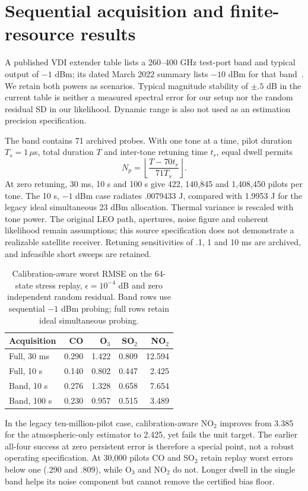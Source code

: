\section{Sequential acquisition and finite-resource results}
A published VDI extender table lists a 260--400 GHz test-port band and typical output of $-1$ dBm; its dated March 2022 summary lists $-10$ dBm for that band~\cite{vdiCurrent,vdi2022}. We retain both powers as scenarios. Typical magnitude stability of $\pm.5$ dB in the current table is neither a measured spectral error for our setup nor the random residual SD in our likelihood. Dynamic range is also not used as an estimation precision specification.

The band contains 71 archived probes. With one tone at a time, pilot duration $T_s=1\,\mu$s, total duration $T$ and inter-tone retuning time $t_r$, equal dwell permits
\[
N_p=\left\lfloor\frac{T-70t_r}{71T_s}\right\rfloor.
\]
At zero retuning, 30 ms, 10 s and 100 s give 422, 140,845 and 1,408,450 pilots per tone. The 10 s, $-1$ dBm case radiates .0079433 J, compared with 1.9953 J for the legacy ideal simultaneous 23 dBm allocation. Thermal variance is rescaled with tone power. The original LEO path, apertures, noise figure and coherent likelihood remain assumptions; this source specification does not demonstrate a realizable satellite receiver. Retuning sensitivities of .1, 1 and 10 ms are archived, and infeasible short sweeps are retained.

\begin{table}[t]\centering\scriptsize
\caption{Calibration-aware worst RMSE on the 64-state stress replay, $\epsilon=10^{-4}$ dB and zero independent random residual. Band rows use sequential $-1$ dBm probing; full rows retain ideal simultaneous probing.}
\begin{tabular}{lrrrr}\toprule
Acquisition & CO & O$_3$ & SO$_2$ & NO$_2$\\\midrule
Full, 30 ms & 0.290 & 1.422 & 0.809 & 12.594\\
Full, 10 s & 0.140 & 0.802 & 0.447 & 2.425\\
Band, 10 s & 0.276 & 1.328 & 0.658 & 7.654\\
Band, 100 s & 0.230 & 0.957 & 0.515 & 3.489\\
\bottomrule\end{tabular}

\end{table}
In the legacy ten-million-pilot case, calibration-aware NO$_2$ improves from 3.385 for the atmospheric-only estimator to 2.425, yet fails the unit target. The earlier all-four success at zero persistent error is therefore a special point, not a robust operating specification. At 30,000 pilots CO and SO$_2$ retain replay worst errors below one (.290 and .809), while O$_3$ and NO$_2$ do not. Longer dwell in the single band helps its noise component but cannot remove the certified bias floor.

